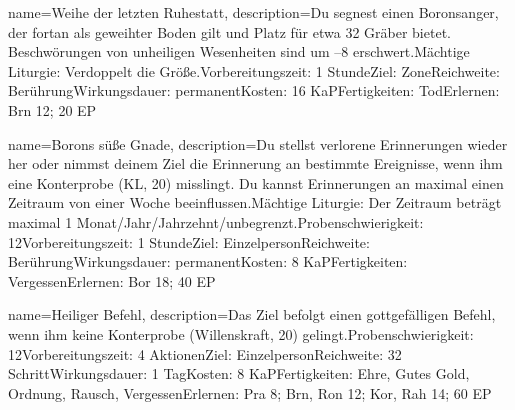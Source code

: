 {
    name={Weihe der letzten Ruhestatt},
    description={Du segnest einen Boronsanger, der fortan als geweihter Boden gilt und Platz für etwa 32 Gräber bietet. Beschwörungen von unheiligen Wesenheiten sind um –8 erschwert.\newline Mächtige Liturgie: Verdoppelt die Größe.\newline Vorbereitungszeit: 1 Stunde\newline Ziel: Zone\newline Reichweite: Berührung\newline Wirkungsdauer: permanent\newline Kosten: 16 KaP\newline Fertigkeiten: Tod\newline Erlernen: Brn 12; 20 EP}
}


{
    name={Borons süße Gnade},
    description={Du stellst verlorene Erinnerungen wieder her oder nimmst deinem Ziel die Erinnerung an bestimmte Ereignisse, wenn ihm eine Konterprobe (KL, 20) misslingt. Du kannst Erinnerungen an maximal einen Zeitraum von einer Woche beeinflussen.\newline Mächtige Liturgie: Der Zeitraum beträgt maximal 1 Monat/Jahr/Jahrzehnt/unbegrenzt.\newline Probenschwierigkeit: 12\newline Vorbereitungszeit: 1 Stunde\newline Ziel: Einzelperson\newline Reichweite: Berührung\newline Wirkungsdauer: permanent\newline Kosten: 8 KaP\newline Fertigkeiten: Vergessen\newline Erlernen: Bor 18; 40 EP}
}


{
    name={Heiliger Befehl},
    description={Das Ziel befolgt einen gottgefälligen Befehl, wenn ihm keine Konterprobe (Willenskraft, 20) gelingt.\newline Probenschwierigkeit: 12\newline Vorbereitungszeit: 4 Aktionen\newline Ziel: Einzelperson\newline Reichweite: 32 Schritt\newline Wirkungsdauer: 1 Tag\newline Kosten: 8 KaP\newline Fertigkeiten: Ehre, Gutes Gold, Ordnung, Rausch, Vergessen\newline Erlernen: Pra 8; Brn, Ron 12; Kor, Rah 14; 60 EP}
}


